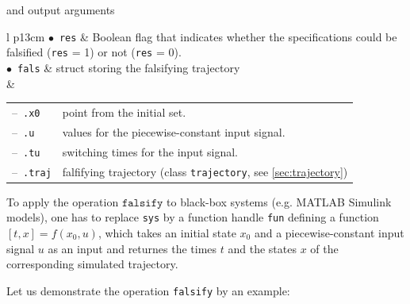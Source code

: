 and output arguments

\begin{center}
\renewcommand{\arraystretch}{1.3}
\begin{tabular}[t]{l p{13cm} }
	$\bullet$~\texttt{res} & Boolean flag that indicates whether the specifications could be falsified (\texttt{res} = 1) or not (\texttt{res} = 0). \\
	$\bullet$~\texttt{fals} & struct storing the falsifying trajectory \\
	& \begin{tabular}[t]{l p{10cm}}	
	 	--~\texttt{.x0} & point from the initial set.  \\
	 	--~\texttt{.u} & values for the piecewise-constant input signal. \\
	 	--~\texttt{.tu} & switching times for the input signal. \\
	 	--~\texttt{.traj} & falfifying trajectory (class \texttt{trajectory}, see \cref{sec:trajectory})
	 \end{tabular}
\end{tabular}
\end{center}

To apply the operation $\texttt{falsify}$ to black-box systems (e.g. MATLAB Simulink models), one has to replace \texttt{sys} by a function handle \texttt{fun} defining a function $[t,x] = f(x_0,u)$, which takes an initial state $x_0$ and a piecewise-constant input signal $u$ as an input and returnes the times $t$ and the states $x$ of the corresponding simulated trajectory.

Let us demonstrate the operation \texttt{falsify} by an example:

\begin{center}
\begin{minipage}[t]{0.58\textwidth}
	\footnotesize
	
\end{minipage}
\begin{minipage}[t]{0.4\textwidth}
	\vspace{0pt}
	\centering
\end{minipage}
\end{center}
